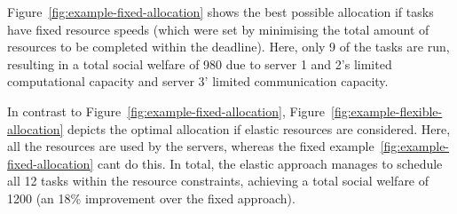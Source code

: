 Figure~\ref{fig:example-fixed-allocation} shows the best possible allocation if tasks have fixed resource speeds (which
were set by minimising the total amount of resources to be completed within the deadline). Here, only 9 of the tasks
are run, resulting in a total social welfare of 980 due to server 1 and 2's limited computational capacity and server
3' limited communication capacity.

In contrast to Figure~\ref{fig:example-fixed-allocation}, Figure~\ref{fig:example-flexible-allocation} depicts the
optimal allocation if elastic resources are considered. Here, all the resources are used by the servers, whereas the
fixed example~\ref{fig:example-fixed-allocation} cant do this. In total, the elastic approach manages to schedule all
12 tasks within the resource constraints, achieving a total social welfare of 1200 (an 18\% improvement over the fixed
approach).